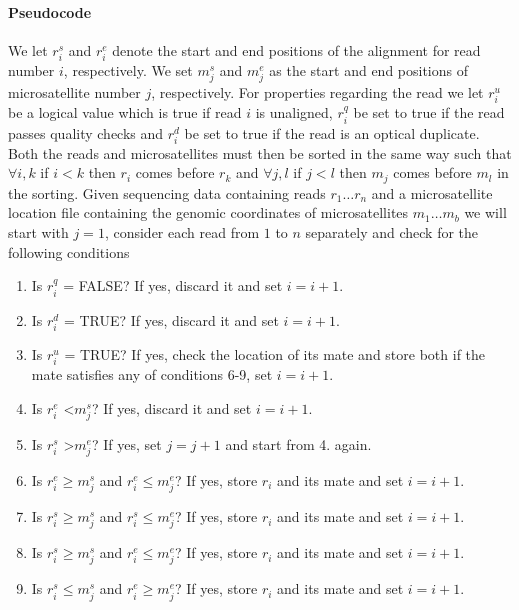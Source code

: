 \documentclass{bioinfo}
\begin{document}
    \paragraph{\textbf{Pseudocode}} 
    We let $r_i^s$ and $r_i^e$ denote the start and end positions of the alignment for read number $i$, respectively. We set $m_j^s$ and $m_j^e$ as the start and end positions of microsatellite number $j$, respectively. For properties regarding the read we let $r_i^u$ be a logical value which is true if read $i$ is unaligned, $r_i^q$ be set to true if the read passes quality checks and $r_i^d$ be set to true if the read is an optical duplicate. Both the reads and microsatellites must then be sorted in the same way such that $\forall i,k$ if $i<k$ then $r_i$ comes before $r_k$ and $\forall j,l$ if $j<l$ then $m_j$ comes before $m_l$ in the sorting.
    Given sequencing data containing reads $r_1 \dots r_n$ and a microsatellite location file containing the genomic coordinates of microsatellites $m_1 \dots m_b$ we will start with $j=1$, consider each read from $1$ to $n$ separately and check for the following conditions
    \begin{enumerate}
        \item Is $r_i^q$ = FALSE? If yes, discard it and set $i = i+1$.
        \item Is $r_i^d$ = TRUE? If yes, discard it and set $i = i+1$.
        \item Is $r_i^u$ = TRUE? If yes, check the location of its mate and store both if the mate satisfies any of conditions 6-9, set $i = i+1$.
        \item Is $r_i^e$ \textless $m_j^s$? If yes, discard it and set $i = i+1$.
        \item Is $r_i^s$ \textgreater $m_j^e$? If yes, set $j=j+1$ and start from 4. again.
        \item Is $r_i^e \geq m_j^s$ and $r_i^e \leq m_j^e$? If yes, store $r_i$ and its mate and set $i = i+1$.
        \item Is $r_i^s \geq m_j^s$ and $r_i^s \leq m_j^e$? If yes, store $r_i$ and its mate and set $i = i+1$.
        \item Is $r_i^s \geq m_j^s$ and $r_i^e \leq m_j^e$? If yes, store $r_i$ and its mate and set $i = i+1$.
        \item Is $r_i^s \leq m_j^s$ and $r_i^e \geq m_j^e$? If yes, store $r_i$ and its mate and set $i = i+1$.
    \end{enumerate}
    
\end{document}
